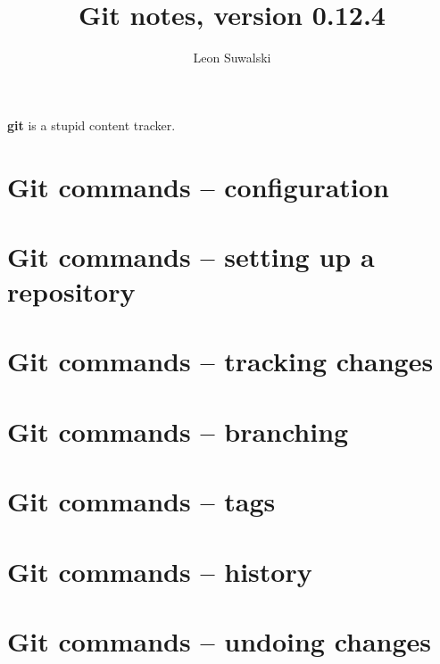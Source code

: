 \documentclass{charuun}
\title{Git notes, version 0.12.4}
\author{Leon Suwalski}
\begin{document}
\maketitle
\raggedright

\textbf{git} is a stupid content tracker.

\section{Git commands -- configuration}


\section{Git commands -- setting up a repository}



\section{Git commands -- tracking changes}






\section{Git commands -- branching}







\section{Git commands -- tags}


\section{Git commands -- history}







\section{Git commands -- undoing changes}




\end{document}
